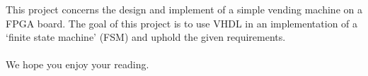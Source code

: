 This project concerns the design and implement of a simple vending machine on a FPGA board. 
The goal of this project is to use VHDL in an implementation of a `finite state machine' (FSM) and uphold the given requirements. 
\\  
\\ 
We hope you enjoy your reading.

